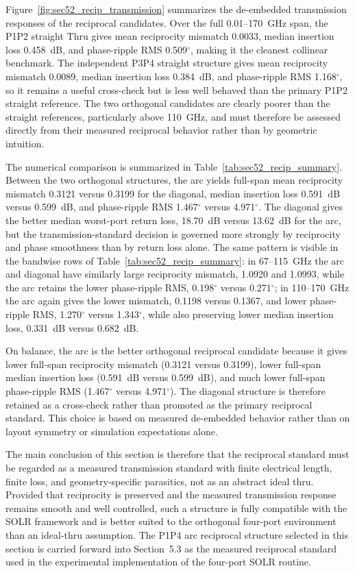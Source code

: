 Figure~\ref{fig:sec52_recip_transmission} summarizes the de-embedded transmission responses of the reciprocal candidates. Over the full 0.01--170~GHz span, the P1P2 straight Thru gives mean reciprocity mismatch 0.0033, median insertion loss 0.458~dB, and phase-ripple RMS 0.509$^\circ$, making it the cleanest collinear benchmark. The independent P3P4 straight structure gives mean reciprocity mismatch 0.0089, median insertion loss 0.384~dB, and phase-ripple RMS 1.168$^\circ$, so it remains a useful cross-check but is less well behaved than the primary P1P2 straight reference. The two orthogonal candidates are clearly poorer than the straight references, particularly above 110~GHz, and must therefore be assessed directly from their measured reciprocal behavior rather than by geometric intuition.

The numerical comparison is summarized in Table~\ref{tab:sec52_recip_summary}. Between the two orthogonal structures, the arc yields full-span mean reciprocity mismatch 0.3121 versus 0.3199 for the diagonal, median insertion loss 0.591~dB versus 0.599~dB, and phase-ripple RMS 1.467$^\circ$ versus 4.971$^\circ$. The diagonal gives the better median worst-port return loss, 18.70~dB versus 13.62~dB for the arc, but the transmission-standard decision is governed more strongly by reciprocity and phase smoothness than by return loss alone. The same pattern is visible in the bandwise rows of Table~\ref{tab:sec52_recip_summary}: in 67--115~GHz the arc and diagonal have similarly large reciprocity mismatch, 1.0920 and 1.0993, while the arc retains the lower phase-ripple RMS, 0.198$^\circ$ versus 0.271$^\circ$; in 110--170~GHz the arc again gives the lower mismatch, 0.1198 versus 0.1367, and lower phase-ripple RMS, 1.270$^\circ$ versus 1.343$^\circ$, while also preserving lower median insertion loss, 0.331~dB versus 0.682~dB.



On balance, the arc is the better orthogonal reciprocal candidate because it gives lower full-span reciprocity mismatch (0.3121 versus 0.3199), lower full-span median insertion loss (0.591~dB versus 0.599~dB), and much lower full-span phase-ripple RMS (1.467$^\circ$ versus 4.971$^\circ$). The diagonal structure is therefore retained as a cross-check rather than promoted as the primary reciprocal standard. This choice is based on measured de-embedded behavior rather than on layout symmetry or simulation expectations alone.

The main conclusion of this section is therefore that the reciprocal standard must be regarded as a measured transmission standard with finite electrical length, finite loss, and geometry-specific parasitics, not as an abstract ideal thru. Provided that reciprocity is preserved and the measured transmission response remains smooth and well controlled, such a structure is fully compatible with the SOLR framework and is better suited to the orthogonal four-port environment than an ideal-thru assumption. The P1P4 arc reciprocal structure selected in this section is carried forward into Section~5.3 as the measured reciprocal standard used in the experimental implementation of the four-port SOLR routine.
